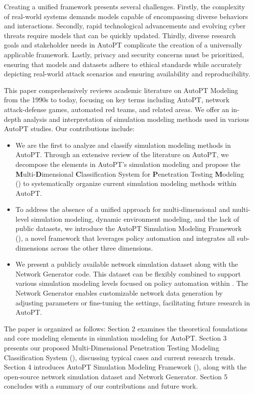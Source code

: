 Creating a unified framework presents several challenges. Firstly, the complexity of real-world systems demands models capable of encompassing diverse behaviors and interactions. Secondly, rapid technological advancements and evolving cyber threats require models that can be quickly updated. Thirdly, diverse research goals and stakeholder needs in AutoPT complicate the creation of a universally applicable framework. Lastly, privacy and security concerns must be prioritized, ensuring that models and datasets adhere to ethical standards while accurately depicting real-world attack scenarios and ensuring availability and reproducibility.




This paper comprehensively reviews academic literature on AutoPT Modeling from the 1990s to today, focusing on key terms including AutoPT, network attack-defense games, automated red teams, and related areas. We offer an in-depth analysis and interpretation of simulation modeling methods used in various AutoPT studies. Our contributions include:

\begin{itemize}
    \item We are the first to analyze and classify simulation modeling methods in AutoPT. Through an extensive review of the literature on AutoPT, we decompose the elements in AutoPT's simulation modeling and propose the \textbf{M}ulti-\textbf{D}imensional \textbf{C}lassification System for \textbf{P}enetration Testing \textbf{M}odeling (\modelcla) to systematically organize current simulation modeling methods within AutoPT.
    
    \item To address the absence of a unified approach for multi-dimensional and multi-level simulation modeling, dynamic environment modeling, and the lack of public datasets, we introduce the AutoPT Simulation Modeling Framework (\modelsim), a novel framework that leverages policy automation and integrates all sub-dimensions across the other three dimensions.

    \item We present a publicly available network simulation dataset along with the Network Generator code. This dataset can be flexibly combined to support various simulation modeling levels focused on policy automation within \modelcla. The Network Generator enables customizable network data generation by adjusting parameters or fine-tuning the settings, facilitating future research in AutoPT.
\end{itemize}

The paper is organized as follows: Section 2 examines the theoretical foundations and core modeling elements in simulation modeling for AutoPT. Section 3 presents our proposed Multi-Dimensional Penetration Testing Modeling Classification System (\modelcla), discussing typical cases and current research trends. Section 4 introduces AutoPT Simulation Modeling Framework (\modelsim), along with the open-source network simulation dataset and Network Generator. Section 5 concludes with a summary of our contributions and future work.
